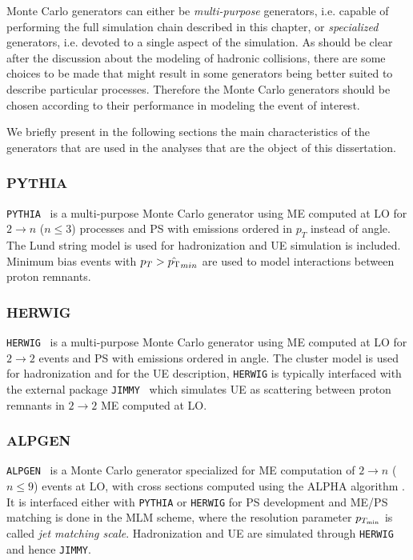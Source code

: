 Monte Carlo generators can either be {\it multi-purpose} generators,
i.e. capable of performing the full simulation chain described in this chapter,
or {\it specialized} generators, i.e. devoted to a single aspect of the
simulation. As should be clear after the discussion about the modeling
of hadronic collisions, there are some choices to be made that might result
in some generators 
being better suited 
to describe particular processes. Therefore
the Monte Carlo generators should be chosen according to their performance
in modeling the event of interest.

We briefly present in the following sections the main characteristics of the generators
that are used in the analyses that are the object of this dissertation.


\subsubsection*{PYTHIA}

\texttt{PYTHIA}~\cite{PYTHIA} is a multi-purpose Monte Carlo generator
using ME computed at LO for $2 \to n$ ($n\leq 3$) processes and PS with emissions
ordered in $p_T$ instead of angle. The Lund string model is used for hadronization
and UE simulation is included.
Minimum bias events with $p_T>\hat{\pt}_{min}$ are used to model interactions
between proton remnants.


\subsubsection*{HERWIG}

\texttt{HERWIG}~\cite{HERWIG} is a multi-purpose Monte Carlo generator
using ME computed at LO for $2 \to 2$ events and PS with emissions ordered in angle. 
The cluster model is used for hadronization and for the UE description, \texttt{HERWIG}
is typically interfaced with the external package \texttt{JIMMY}~\cite{jimmy} which
simulates UE as scattering between proton remnants in  $2 \to 2$ ME computed at LO.


\subsubsection*{ALPGEN}

\texttt{ALPGEN}~\cite{ALPGEN} is a Monte Carlo generator specialized for
ME computation of $2 \to n$ ($n\leq 9$) events at LO, with cross sections 
computed using the ALPHA algorithm \cite{ALPGEN_0}. It is interfaced either
with \texttt{PYTHIA} or \texttt{HERWIG} for PS development and ME/PS matching
is done in the MLM scheme, where the resolution parameter $p_{T_{\rm min}}$ is
called {\it jet matching scale}.
Hadronization and UE are simulated through \texttt{HERWIG}
and hence \texttt{JIMMY}.

